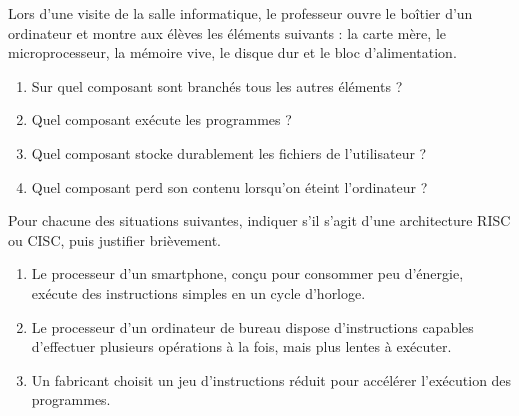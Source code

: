 \documentclass[11pt]{article}
\begin{document}
\begin{exercice}
Lors d'une visite de la salle informatique, le professeur ouvre le boîtier d'un ordinateur et montre aux élèves les éléments suivants : la carte mère, le microprocesseur, la mémoire vive, le disque dur et le bloc d'alimentation.
\begin{enumerate}
  \item Sur quel composant sont branchés tous les autres éléments ?
  \item Quel composant exécute les programmes ?
  \item Quel composant stocke durablement les fichiers de l'utilisateur ?
  \item Quel composant perd son contenu lorsqu'on éteint l'ordinateur ?
\end{enumerate}
\end{exercice}

\begin{exercice}
Pour chacune des situations suivantes, indiquer s'il s'agit d'une architecture RISC ou CISC, puis justifier brièvement.
\begin{enumerate}
  \item Le processeur d'un smartphone, conçu pour consommer peu d'énergie, exécute des instructions simples en un cycle d'horloge.
  \item Le processeur d'un ordinateur de bureau dispose d'instructions capables d'effectuer plusieurs opérations à la fois, mais plus lentes à exécuter.
  \item Un fabricant choisit un jeu d'instructions réduit pour accélérer l'exécution des programmes.
\end{enumerate}
\end{exercice}
\end{document}

